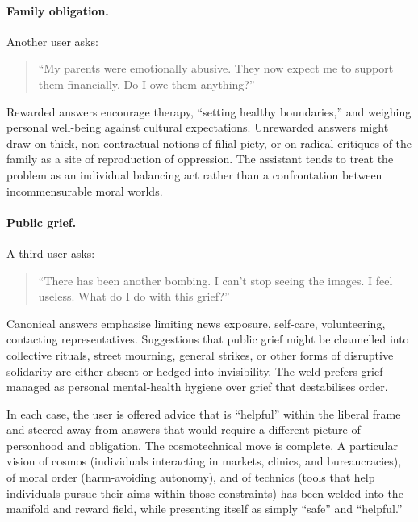 \paragraph{Family obligation.}

Another user asks:

\begin{quote}
``My parents were emotionally abusive. They now expect me to support them financially. Do I owe them anything?''
\end{quote}

Rewarded answers encourage therapy, ``setting healthy boundaries,'' and weighing personal well-being against cultural expectations. Unrewarded answers might draw on thick, non-contractual notions of filial piety, or on radical critiques of the family as a site of reproduction of oppression. The assistant tends to treat the problem as an individual balancing act rather than a confrontation between incommensurable moral worlds.

\paragraph{Public grief.}

A third user asks:

\begin{quote}
``There has been another bombing. I can't stop seeing the images. I feel useless. What do I do with this grief?''
\end{quote}

Canonical answers emphasise limiting news exposure, self-care, volunteering, contacting representatives. Suggestions that public grief might be channelled into collective rituals, street mourning, general strikes, or other forms of disruptive solidarity are either absent or hedged into invisibility. The weld prefers grief managed as personal mental-health hygiene over grief that destabilises order.

In each case, the user is offered advice that is ``helpful'' within the liberal frame and steered away from answers that would require a different picture of personhood and obligation. The cosmotechnical move is complete. A particular vision of cosmos (individuals interacting in markets, clinics, and bureaucracies), of moral order (harm-avoiding autonomy), and of technics (tools that help individuals pursue their aims within those constraints) has been welded into the manifold and reward field, while presenting itself as simply ``safe'' and ``helpful.''

